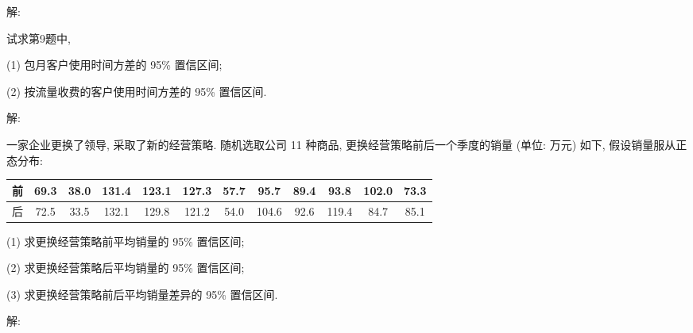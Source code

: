 \documentclass[standard]{ExBook}
\begin{document}
\begin{qitems}
\vspace{-5em}

    \begin{bbox}
解: 
    \end{bbox}

\vspace{-5em}

    \begin{bbox}
    \begin{shaded}
        \qitem
试求第9题中,

(1) 包月客户使用时间方差的 95\% 置信区间;

(2) 按流量收费的客户使用时间方差的 95\% 置信区间.
    \end{shaded}
    \end{bbox}

\vspace{-5em}

    \begin{bbox}
解: 
    \end{bbox}

\vspace{-5em}

    \begin{bbox}
    \begin{shaded}
        \qitem
一家企业更换了领导, 采取了新的经营策略. 随机选取公司 11 种商品, 更换经营策略前后一个季度的销量 (单位: 万元) 如下, 假设销量服从正态分布:
\begin{center}
\setlength{\tabcolsep}{8.5pt}
\begin{tabular}{c|ccccccccccc}
    \hline
    前 & 69.3 & 38.0 & 131.4 & 123.1 & 127.3 & 57.7 & 95.7 & 89.4 & 93.8 & 102.0 & 73.3\\
    \hline
    后 & 72.5 & 33.5 & 132.1 & 129.8 & 121.2 & 54.0 & 104.6 & 92.6 & 119.4 & 84.7 & 85.1\\
    \hline
\end{tabular}
\end{center}
(1) 求更换经营策略前平均销量的 95\% 置信区间;

(2) 求更换经营策略后平均销量的 95\% 置信区间;

(3) 求更换经营策略前后平均销量差异的 95\% 置信区间.
    \end{shaded}
    \end{bbox}

\vspace{-5em}

    \begin{bbox}
解: 
    \end{bbox}


\end{qitems}
\end{document}
